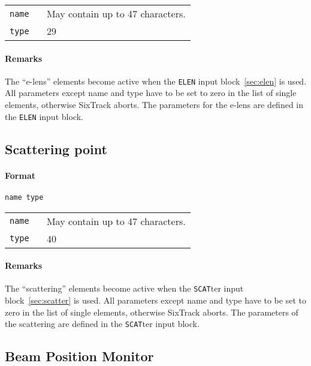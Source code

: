 \bigskip
\begin{tabular}{@{}lp{0.8\linewidth}}
    \texttt{name} & May contain up to 47 characters. \\
    \texttt{type} & 29
\end{tabular}

\paragraph{Remarks}
The ``e-lens'' elements become active when the \texttt{ELEN} input block~\ref{sec:elen} is used.
All parameters except name and type have to be set to zero in the list of single elements, otherwise SixTrack aborts.
The parameters for the e-lens are defined in the \texttt{ELEN} input block.

\subsection{Scattering point} \label{SCAT}

\paragraph{Format} \texttt{name type}

\bigskip
\begin{tabular}{@{}lp{0.8\linewidth}}
    \texttt{name} & May contain up to 47 characters. \\
    \texttt{type} & 40
\end{tabular}

\paragraph{Remarks}
The ``scattering'' elements become active when the \texttt{SCAT}ter input block~\ref{sec:scatter} is used.
All parameters except name and type have to be set to zero in the list of single elements, otherwise SixTrack aborts.
The parameters of the scattering are defined in the \texttt{SCAT}ter input block.

\subsection{Beam Position Monitor} \label{BPM}

